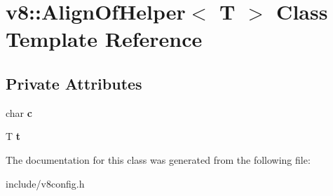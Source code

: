 \hypertarget{classv8_1_1_align_of_helper}{}\section{v8\+:\+:Align\+Of\+Helper$<$ T $>$ Class Template Reference}
\label{classv8_1_1_align_of_helper}
\subsection*{Private Attributes}
\begin{DoxyCompactItemize}
\item 
char {\bfseries c}\hypertarget{classv8_1_1_align_of_helper_ac23697d1381684b3f4a53f8ff0f29897}{}\label{classv8_1_1_align_of_helper_ac23697d1381684b3f4a53f8ff0f29897}

\item 
T {\bfseries t}\hypertarget{classv8_1_1_align_of_helper_aebba37d9841cf6fb72eaf24e2ba9e33a}{}\label{classv8_1_1_align_of_helper_aebba37d9841cf6fb72eaf24e2ba9e33a}

\end{DoxyCompactItemize}


The documentation for this class was generated from the following file\+:\begin{DoxyCompactItemize}
\item 
include/v8config.\+h\end{DoxyCompactItemize}
